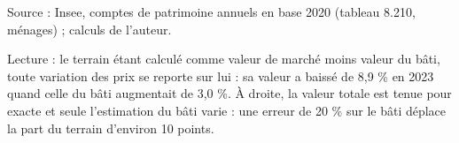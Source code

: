 Source : Insee, comptes de patrimoine annuels en base 2020 (tableau 8.210, ménages) ; calculs de l'auteur.\par Lecture : le terrain étant calculé comme valeur de marché moins valeur du bâti, toute variation des prix se reporte sur lui : sa valeur a baissé de 8,9 \% en 2023 quand celle du bâti augmentait de 3,0 \%. À droite, la valeur totale est tenue pour exacte et seule l'estimation du bâti varie : une erreur de 20 \% sur le bâti déplace la part du terrain d'environ 10 points.
